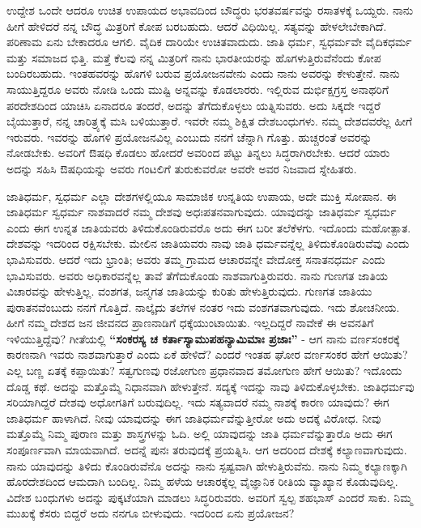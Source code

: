 ಉದ್ದೇಶ ಒಂದೇ ಆದರೂ ಉಚಿತ ಉಪಾಯದ ಅಭಾವದಿಂದ ಬೌದ್ಧರು ಭರತವರ್ಷ\break ವನ್ನು ರಸಾತಳಕ್ಕೆ ಒಯ್ದರು. ನಾನು ಹೀಗೆ ಹೇಳಿದರೆ ನನ್ನ ಬೌದ್ಧ ಮಿತ್ರರಿಗೆ ಕೋಪ ಬರಬಹುದು. ಆದರೆ ವಿಧಿಯಿಲ್ಲ. ಸತ್ಯವನ್ನು ಹೇಳಲೇಬೇಕಾಗಿದೆ. ಪರಿಣಾಮ ಏನು ಬೇಕಾದರೂ ಆಗಲಿ. ವೈದಿಕ ದಾರಿಯೇ ಉಚಿತವಾದುದು. ಜಾತಿ ಧರ್ಮ, ಸ್ವಧರ್ಮವೇ ವೈದಿಕಧರ್ಮ ಮತ್ತು ಸಮಾಜದ ಭಿತ್ತಿ. ಮತ್ತೆ ಕೆಲವು ನನ್ನ ಮಿತ್ರರಿಗೆ ನಾನು ಭಾರತೀಯರನ್ನು ಹೊಗಳುತ್ತಿರುವೆನೆಂದು ಕೋಪ ಬಂದಿರಬಹುದು. ಇಂತಹವರನ್ನು ಹೊಗಳಿ ಬರುವ ಪ್ರಯೋಜನವೇನು ಎಂದು ನಾನು ಅವರನ್ನು ಕೇಳುತ್ತೇನೆ. ನಾನು ಸಾಯುತ್ತಿದ್ದರೂ ಅವರು ನೋಡಿ ಒಂದು ಮುಷ್ಟಿ ಅನ್ನವನ್ನು ಕೊಡಲಾರರು. ಇಲ್ಲಿರುವ ದುರ್ಭಿಕ್ಷಗ್ರಸ್ತ ಅನಾಥರಿಗೆ ಪರದೇಶದಿಂದ ಯಾಚಿಸಿ ಏನಾದರೂ ತಂದರೆ, ಅದನ್ನು ತೆಗೆದುಕೊಳ್ಳಲು ಯತ್ನಿಸುವರು. ಅದು ಸಿಕ್ಕದೇ ಇದ್ದರೆ ಬೈಯುತ್ತಾರೆ, ನನ್ನ ಚಾರಿತ್ರ್ಯಕ್ಕೆ ಮಸಿ ಬಳಿಯುತ್ತಾರೆ. ಇವರೇ ನಮ್ಮ ಶಿಕ್ಷಿತ ದೇಶಬಂಧುಗಳು. ನಮ್ಮ ದೇಶದವರೆಲ್ಲ ಹೀಗೆ ಇರುವರು. ಇವರನ್ನು ಹೊಗಳಿ ಪ್ರಯೋಜನವಿಲ್ಲ ಎಂಬುದು ನನಗೆ ಚೆನ್ನಾಗಿ ಗೊತ್ತು. ಹುಚ್ಚರಂತೆ ಅವರನ್ನು ನೋಡಬೇಕು. ಅವರಿಗೆ ಔಷಧಿ ಕೊಡಲು ಹೋದರೆ ಅವರಿಂದ ಪೆಟ್ಟು ತಿನ್ನಲು ಸಿದ್ಧರಾಗಿರಬೇಕು. ಆದರೆ ಯಾರು ಅದನ್ನು ಸಹಿಸಿ ಔಷಧಿಯನ್ನು ಅವರು ಗಂಟಲಿಗೆ ತುರುಕುವರೋ ಅವರೇ ಅವರ ನಿಜವಾದ ಸ್ನೇಹಿತರು.

\newpage

ಜಾತಿಧರ್ಮ, ಸ್ವಧರ್ಮ ಎಲ್ಲಾ ದೇಶಗಳಲ್ಲಿಯೂ ಸಾಮಾಜಿಕ ಉನ್ನತಿಯ ಉಪಾಯ, ಅದೇ ಮುಕ್ತಿ ಸೋಪಾನ. ಈ ಜಾತಿಧರ್ಮ ಸ್ವಧರ್ಮ ನಾಶವಾದರೆ ನಮ್ಮ ದೇಶವು ಅಧಃಪತನವಾಗುವುದು. ಯಾವುದನ್ನು ಜಾತಿಧರ್ಮ ಸ್ವಧರ್ಮ ಎಂದು ಈಗ ಉನ್ನತ ಜಾತಿಯವರು ತಿಳಿದುಕೊಂಡಿರುವರೊ ಅದು ಈಗ ಬರೀ ತಲೆಕೆಳಗು. ಇದೊಂದು ಮಹೋತ್ಪಾತ. ದೇಶವನ್ನು ಇದರಿಂದ ರಕ್ಷಿಸಬೇಕು. ಮೇಲಿನ ಜಾತಿಯವರು ನಾವು ಜಾತಿ ಧರ್ಮವನ್ನೆಲ್ಲ ತಿಳಿದುಕೊಂಡಿರುವೆವು ಎಂದು ಭಾವಿಸುವರು. ಆದರೆ ಇದು ಭ್ರಾಂತಿ; ಅವರು ತಮ್ಮ ಗ್ರಾಮದ ಆಚಾರವನ್ನೇ ವೇದೋಕ್ತ ಸನಾತನಧರ್ಮ ಎಂದು ಭಾವಿಸುವರು. ಅವರು ಅಧಿಕಾರವನ್ನೆಲ್ಲ ತಾವೆ ತೆಗೆದುಕೊಂಡು ನಾಶವಾಗುತ್ತಿರುವರು. ನಾನು ಗುಣಗತ ಜಾತಿಯ ವಿಚಾರವನ್ನು ಹೇಳುತ್ತಿಲ್ಲ. ವಂಶಗತ, ಜನ್ಮಗತ ಜಾತಿಯನ್ನು ಕುರಿತು ಹೇಳುತ್ತಿರುವುದು. ಗುಣಗತ ಜಾತಿಯು ಪುರಾತನವೆಂಬುದು ನನಗೆ ಗೊತ್ತಿದೆ. ನಾಲ್ಕೈದು ತಲೆಗಳ ನಂತರ ಇದು ವಂಶಗತವಾಗುವುದು. ಇದು ಶೋಚನೀಯ. ಹೀಗೆ ನಮ್ಮ ದೇಶದ ಜನ ಜೀವನದ ಪ್ರಾಣನಾಡಿಗೆ ಧಕ್ಕೆಯುಂಟಾಯಿತು. ಇಲ್ಲದಿದ್ದರೆ ನಾವೇಕೆ ಈ ಅವನತಿಗೆ ಇಳಿಯುತ್ತಿದ್ದೆವು? ಗೀತೆಯಲ್ಲಿ \textbf{“ಸಂಕರಸ್ಯ ಚ ಕರ್ತಾಸ್ಯಾಮುಪಹನ್ಯಾಮಿಮಾಃ ಪ್ರಜಾಃ”} - ಆಗ ನಾನು ವರ್ಣಸಂಕರಕ್ಕೆ ಕಾರಣನಾಗಿ ಇವರು ನಾಶವಾಗುತ್ತಾರೆ ಎಂದು ಏಕೆ ಹೇಳಿದೆ? ಎಂದರೆ ಇಂತಹ ಘೋರ ವರ್ಣಸಂಕರ ಹೇಗೆ ಆಯಿತು? ಎಲ್ಲ ಬಣ್ಣ ಏತಕ್ಕೆ ಕಪ್ಪಾಯಿತು? ಸತ್ವಗುಣವು ರಜೋಗುಣ ಪ್ರಧಾನವಾದ ತಮೋಗುಣ ಹೇಗೆ ಆಯಿತು? ಇದೊಂದು ದೊಡ್ಡ ಕಥೆ. ಅದನ್ನು ಮತ್ತೊಮ್ಮೆ ನಿಧಾನವಾಗಿ ಹೇಳುತ್ತೇನೆ. ಸದ್ಯಕ್ಕೆ ಇದನ್ನು ನಾವು ತಿಳಿದುಕೊಳ್ಳಬೇಕು. ಜಾತಿಧರ್ಮವು ಸರಿಯಾಗಿದ್ದರೆ ದೇಶವು ಅಧೋಗತಿಗೆ ಬರುವುದಿಲ್ಲ. ಇದು ಸತ್ಯವಾದರೆ ನಮ್ಮ ನಾಶಕ್ಕೆ ಕಾರಣ ಯಾವುದು? ಈಗ ಜಾತಿಧರ್ಮ ಹಾಳಾಗಿದೆ. ನೀವು ಯಾವುದನ್ನು ಈಗ ಜಾತಿಧರ್ಮವೆನ್ನುತ್ತೀರೋ ಅದು ಅದಕ್ಕೆ ವಿರೋಧ. ನೀವು ಮತ್ತೊಮ್ಮೆ ನಿಮ್ಮ ಪುರಾಣ ಮತ್ತು ಶಾಸ್ತ್ರಗಳನ್ನು ಓದಿ. ಅಲ್ಲಿ ಯಾವುದನ್ನು ಜಾತಿ ಧರ್ಮವೆನ್ನುತ್ತಾರೊ ಅದು ಈಗ ಸಂಪೂರ್ಣವಾಗಿ ಮಾಯವಾಗಿದೆ. ಅದನ್ನೆ ಪುನಃ ತರುವುದಕ್ಕೆ ಪ್ರಯತ್ನಿಸಿ. ಆಗ ಅದರಿಂದ ದೇಶಕ್ಕೆ ಕಲ್ಯಾಣವಾಗುವುದು. ನಾನು ಯಾವುದನ್ನು ತಿಳಿದು ಕೊಂಡಿರುವೆನೊ ಅದನ್ನು ನಾನು ಸ್ಪಷ್ಟವಾಗಿ ಹೇಳುತ್ತಿರುವೆನು. ನಾನು ನಿಮ್ಮ ಕಲ್ಯಾಣಕ್ಕಾಗಿ ಹೊರದೇಶದಿಂದ ಆಮದಾಗಿ ಬಂದಿಲ್ಲ. ನಿಮ್ಮ ಹಳೆಯ ಆಚಾರಕ್ಕೆಲ್ಲ ವೈಜ್ಞಾನಿಕ ರೀತಿಯ ವ್ಯಾಖ್ಯಾನ ಕೊಡುವುದಿಲ್ಲ. ವಿದೇಶ ಬಂಧುಗಳು ಅದನ್ನು ಪುಕ್ಕಟೆಯಾಗಿ ಮಾಡಲು ಸಿದ್ಧರಿರುವರು. ಅವರಿಗೆ ಸ್ವಲ್ಪ ಶಹಭಾಸ್​ ಎಂದರೆ ಸಾಕು. ನಿಮ್ಮ ಮುಖಕ್ಕೆ ಕೆಸರು ಬಿದ್ದರೆ ಅದು ನನಗೂ ಬೀಳುವುದು. ಇದರಿಂದ ಏನು ಪ್ರಯೋಜನ?

